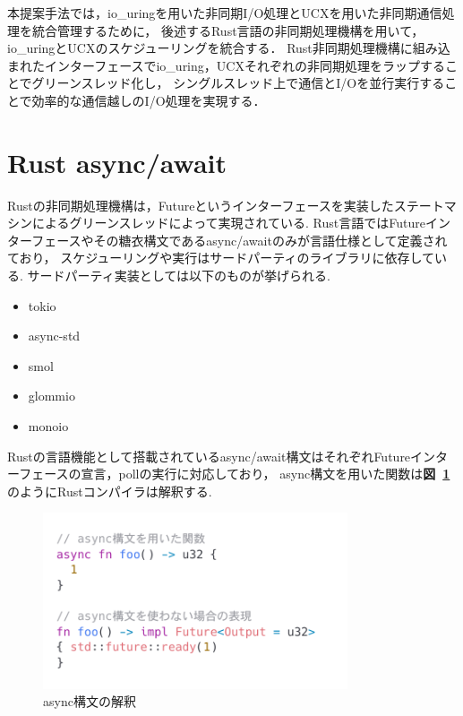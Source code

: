 \documentclass[a4paper,11pt]{jreport}
\newcommand\figref[1]{\textbf{図~\ref{fig:#1}}}
\begin{document}
本提案手法では，io\_uringを用いた非同期I/O処理とUCXを用いた非同期通信処理を統合管理するために，
後述するRust言語の非同期処理機構を用いて，io\_uringとUCXのスケジューリングを統合する．
Rust非同期処理機構に組み込まれたインターフェースでio\_uring，UCXそれぞれの非同期処理をラップすることでグリーンスレッド化し，
シングルスレッド上で通信とI/Oを並行実行することで効率的な通信越しのI/O処理を実現する．

\section{Rust async/await}
Rustの非同期処理機構\cite{rust-async-rfc}は，Futureというインターフェースを実装したステートマシンによるグリーンスレッドによって実現されている.
Rust言語ではFutureインターフェースやその糖衣構文であるasync/awaitのみが言語仕様として定義されており，
スケジューリングや実行はサードパーティのライブラリに依存している.
サードパーティ実装としては以下のものが挙げられる.

\begin{itemize}
	\item tokio
	\item async-std
	\item smol
	\item glommio
	\item monoio
\end{itemize}

Rustの言語機能として搭載されているasync/await構文はそれぞれFutureインターフェースの宣言，pollの実行に対応しており，
async構文を用いた関数は\figref{async}のようにRustコンパイラは解釈する.



\begin{figure}[tb]
	\centering
	\includegraphics[width=9cm, bb=0 0 800 550]{figures/async_future.png}
	\caption{async構文の解釈}
	\label{fig:async}
\end{figure}
\end{document}
